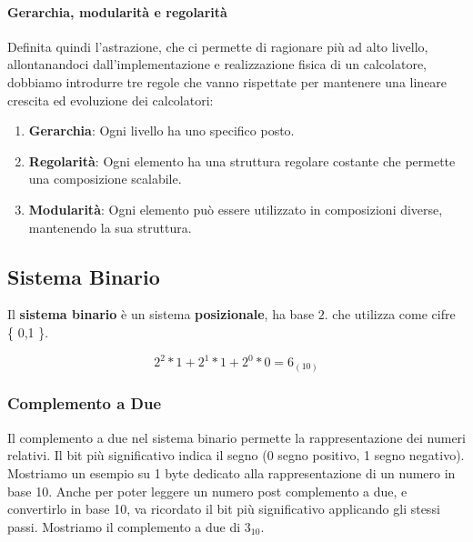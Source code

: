 \documentclass{article}
\begin{document}
\newpage

\paragraph{Gerarchia, modularità e regolarità}

Definita quindi l'astrazione, che ci permette di ragionare più ad alto livello, allontanandoci dall'implementazione e realizzazione fisica di un calcolatore, dobbiamo introdurre tre regole che vanno rispettate per mantenere una lineare crescita ed evoluzione dei calcolatori:

\begin{enumerate}
    \item \textbf{Gerarchia}: Ogni livello ha uno specifico posto.
    \item \textbf{Regolarità}: Ogni elemento ha una struttura regolare costante che permette una composizione scalabile.
    \item \textbf{Modularità}: Ogni elemento può essere utilizzato in composizioni diverse, mantenendo la sua struttura.
\end{enumerate}

\subsection{Sistema Binario}

Il \textbf{sistema binario} è un sistema \textbf{posizionale}, ha base $2$. che utilizza come cifre \{ 0,1 \}. 

\[ 2^{2} * 1 + 2^{1} * 1 + 2^{0} * 0 = 6_{(10)} \]

\subsubsection{Complemento a Due}

Il complemento a due nel sistema binario permette la rappresentazione dei numeri relativi. Il bit più significativo indica il segno (0 segno positivo, 1 segno negativo). Mostriamo un esempio su 1 byte dedicato alla rappresentazione di un numero in base 10. Anche per poter leggere un numero post complemento a due, e convertirlo in base 10, va ricordato il bit più significativo applicando gli stessi passi. Mostriamo il complemento a due di $3_{10}$.
\end{document}
